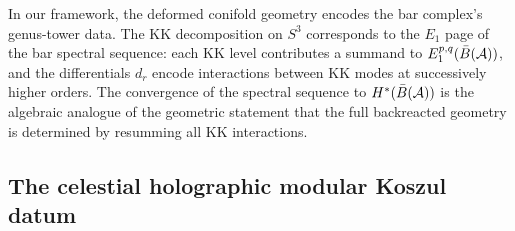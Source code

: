 \begin{remark}
\label{rem:conifold-bar-spectral}
In our framework, the deformed conifold geometry encodes the bar
complex's genus-tower data. The KK decomposition on $S^3$ corresponds
to the $E_1$ page of the bar spectral sequence: each KK level
contributes a summand to $E_1^{p,q}(\bar{B}(\mathcal A))$, and the
differentials $d_r$ encode interactions between KK modes at successively
higher orders. The convergence of the spectral sequence to
$H^*(\bar{B}(\mathcal A))$ is the algebraic analogue of the geometric statement
that the full backreacted geometry is determined by resumming all
KK interactions.
\end{remark}

\subsection{The celestial holographic modular Koszul datum}
\label{subsec:celestial-hmkd}

